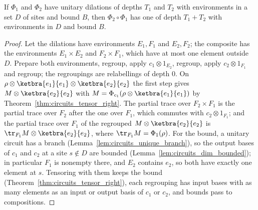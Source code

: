 \begin{theorem}
    \label{thm:protocols_dilation_comp}
    \leanok
    If $\Phi_1$ and $\Phi_2$ have unitary dilations of depths $T_1$ and $T_2$ with environments
    in a set $D$ of sites and bound $B$, then $\Phi_2\circ\Phi_1$ has one of depth $T_1+T_2$
    with environments in $D$ and bound $B$.
\end{theorem}
\begin{proof}\leanok
    Let the dilations have environments $E_1,F_1$ and $E_2,F_2$; the composite has the
    environments $E_1\times E_2$ and $F_2\times F_1$, which have at most one element outside $D$.
    Prepare both environments, regroup, apply $c_1\otimes1_{E_2}$, regroup, apply
    $c_2\otimes1_{F_1}$ and regroup; the regroupings are relabellings of depth $0$. On
    $\rho\otimes\ketbra{e_1}{e_1}\otimes\ketbra{e_2}{e_2}$ the first step gives
    $M\otimes\ketbra{e_2}{e_2}$ with $M=\Phi_{c_1}(\rho\otimes\ketbra{e_1}{e_1})$ by
    Theorem~\ref{thm:circuits_tensor_right}. The partial trace over $F_2\times F_1$ is the
    partial trace over $F_2$ after the one over $F_1$, which commutes with
    $c_2\otimes1_{F_1}$; and the partial trace over $F_1$ of the regrouped
    $M\otimes\ketbra{e_2}{e_2}$ is $\tr_{F_1}M\otimes\ketbra{e_2}{e_2}$, where
    $\tr_{F_1}M=\Phi_1(\rho)$. For the bound, a unitary circuit has a branch
    (Lemma~\ref{lem:circuits_unique_branch}), so the output bases of $c_1$ and $c_2$ at a site
    $s\notin D$ are bounded (Lemma~\ref{lem:circuits_dim_bounded}); in particular $F_1$ is
    nonempty there, and $E_2$ contains $e_2$, so both have exactly one element at $s$. Tensoring
    with them keeps the bound (Theorem~\ref{thm:circuits_tensor_right}), each regrouping has
    input bases with as many elements as an input or output basis of $c_1$ or $c_2$, and bounds
    pass to compositions.
\end{proof}

